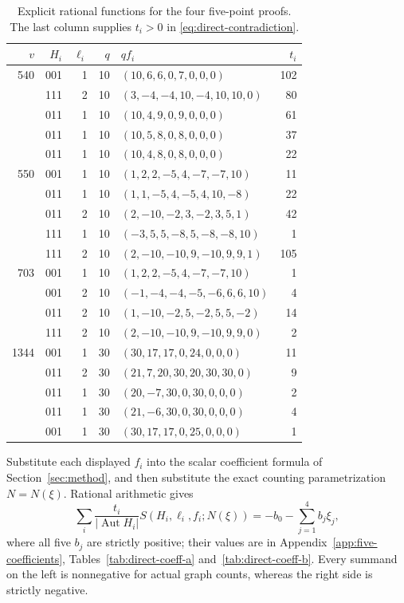 \documentclass[11pt]{article}
\theoremstyle{remark}
\numberwithin{equation}{section}
\begin{document}
\begin{table}[htbp]\centering\small
\caption{Explicit rational functions for the four five-point proofs.
The last column supplies $t_i>0$ in \eqref{eq:direct-contradiction}.}
\label{tab:direct-functions}
\setlength{\tabcolsep}{4pt}
\begin{tabular}{rrrrlr}\toprule
$v$&$H_i$&$\ell_i$&$q$&$qf_i$&$t_i$\\\midrule
540&001&1&10&$(10,6,6,0,7,0,0,0)$&102\\
&111&2&10&$(3,-4,-4,10,-4,10,10,0)$&80\\
&011&1&10&$(10,4,9,0,9,0,0,0)$&61\\
&011&1&10&$(10,5,8,0,8,0,0,0)$&37\\
&011&1&10&$(10,4,8,0,8,0,0,0)$&22\\
\midrule
550&001&1&10&$(1,2,2,-5,4,-7,-7,10)$&11\\
&011&1&10&$(1,1,-5,4,-5,4,10,-8)$&22\\
&011&2&10&$(2,-10,-2,3,-2,3,5,1)$&42\\
&111&1&10&$(-3,5,5,-8,5,-8,-8,10)$&1\\
&111&2&10&$(2,-10,-10,9,-10,9,9,1)$&105\\
\midrule
703&001&1&10&$(1,2,2,-5,4,-7,-7,10)$&1\\
&001&2&10&$(-1,-4,-4,-5,-6,6,6,10)$&4\\
&011&2&10&$(1,-10,-2,5,-2,5,5,-2)$&14\\
&111&2&10&$(2,-10,-10,9,-10,9,9,0)$&2\\
\midrule
1344&001&1&30&$(30,17,17,0,24,0,0,0)$&11\\
&011&2&30&$(21,7,20,30,20,30,30,0)$&9\\
&011&1&30&$(20,-7,30,0,30,0,0,0)$&2\\
&011&1&30&$(21,-6,30,0,30,0,0,0)$&4\\
&001&1&30&$(30,17,17,0,25,0,0,0)$&1\\
\bottomrule\end{tabular}\end{table}

Substitute each displayed $f_i$ into the scalar coefficient formula of
Section~\ref{sec:method}, and then substitute the exact counting parametrization
$N=N(\xi)$.  Rational arithmetic gives
\begin{equation}\label{eq:direct-contradiction}
 \sum_i\frac{t_i}{|\operatorname{Aut}H_i|}
 S(H_i,\ell_i,f_i;N(\xi))
 =-b_0-\sum_{j=1}^4b_j\xi_j,
\end{equation}
where all five $b_j$ are strictly positive; their values are in
Appendix~\ref{app:five-coefficients}, Tables~\ref{tab:direct-coeff-a} and~\ref{tab:direct-coeff-b}.
Every summand on the left is nonnegative for actual graph counts,
whereas the right side is strictly negative.
\end{document}
